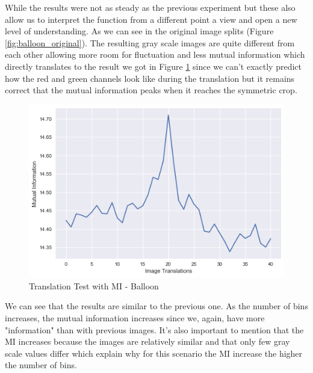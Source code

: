 \documentclass{article}
\begin{document}
\begin{flushleft}
While the results were not as steady as the previous experiment but these also allow us to interpret the function from a different point a view and open a new level of understanding. As we can see in the original image splits (Figure \ref{fig:balloon_original}). The resulting gray scale images are quite different from each other allowing more room for fluctuation and less mutual information which directly translates to the result we got in Figure \ref{fig:balloon_translations} since we can't exactly predict how the red and green channels look like during the translation but it remains correct that the mutual information peaks when it reaches the symmetric crop.
\end{flushleft}

\begin{figure}[H]
    \centering
    \includegraphics[width=\linewidth]{experiments/balloon/balloon-translations.png}
    \caption{Translation Test with MI - Balloon}
    \label{fig:balloon_translations}
\end{figure}

\begin{flushleft}
We can see that the results are similar to the previous one. As the number of bins increases, the mutual information increases since we, again, have more "information" than with previous images. It's also important to mention that the MI increases because the images are relatively similar and that only few gray scale values differ which explain why for this scenario the MI increase the higher the number of bins.
\end{flushleft}
\end{document}
